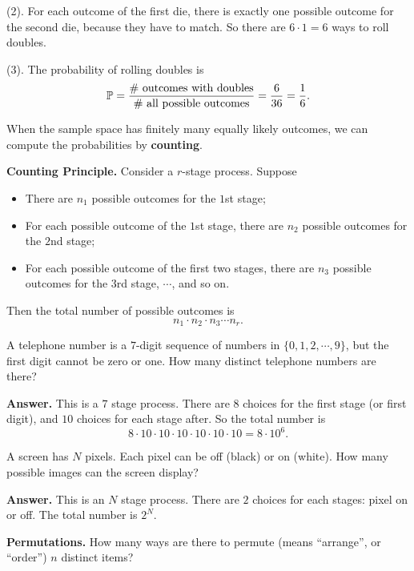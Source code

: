   (2). For each outcome of the first die, there is exactly one possible outcome
  for the second die, because they have to match. So there are $6\cdot 1 = 6$
  ways to roll doubles.
  

  (3). The probability of rolling doubles is
  \[
    \mathbb{P} = \frac{\# ~\text{outcomes with doubles}}{\#~\text{all possible
        outcomes}} = \frac{6}{36} = \frac{1}{6}.
  \]

  \begin{remark}
    When the sample space has finitely many equally likely outcomes, we can
    compute the probabilities by \textbf{counting}.
  \end{remark}

  \textbf{Counting Principle.}  Consider a $r$-stage process. Suppose
  \begin{itemize}
  \item There are $n_1$ possible outcomes for the $1$st stage;
  \item For each possible outcome of the $1$st stage, there are $n_2$ possible
    outcomes for the $2$nd stage;
  \item For each possible outcome of the first two stages, there are $n_3$
    possible outcomes for the $3$rd stage, $\cdots$, and so on.
  \end{itemize}
  Then the total number of possible outcomes is
  \[
    n_1\cdot n_2\cdot n_3\cdots n_r.
  \]

  \begin{example}
    A telephone number is a $7$-digit sequence of numbers in $\{0,1,2,\cdots,
    9\}$, but the first digit cannot be zero or one. How many distinct telephone
    numbers are there?
  \end{example}

  \textbf{Answer.} This is a $7$ stage process. There are $8$ choices for the
  first stage (or first digit), and $10$ choices for each stage after. So the
  total number is
  \[
    8\cdot 10\cdot 10\cdot 10\cdot 10\cdot 10\cdot 10 = 8\cdot 10^6.
  \]

  \begin{example}
    A screen has $N$ pixels. Each pixel can be off (black) or on (white). How
    many possible images can the screen display?
  \end{example}

  \textbf{Answer.} This is an $N$ stage process. There are $2$ choices for each
  stages: pixel on or off. The total number is $2^N$.

  \textbf{Permutations.} How many ways are there to permute (means ``arrange'',
  or ``order'') $n$ distinct items?

